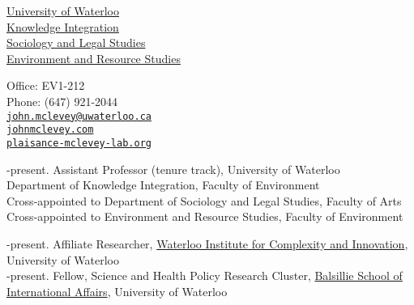 \documentclass[11pt,usenames,dvipsnames]{article}
\makeatletter
\def\myemail{john.mclevey@uwaterloo.ca}
\def\myphone{(647) 921-2044}
\def\lastupdated{Last Updated: June 25, 2013}
\makeatother
\begin{document}
\begin{minipage}[t]{2.95in}
 \flushright \footnotesize \href{https://uwaterloo.ca/}{University of Waterloo} \\  \href{https://uwaterloo.ca/knowledge-integration/faculty-mclevey}{Knowledge Integration} \\ \href{http://sociology.uwaterloo.ca/}{Sociology and Legal Studies} \\ \href{https://uwaterloo.ca/environment-resource-studies/}{Environment and Resource Studies} \\
  \end{minipage}
\hfill     
\hfill
\begin{minipage}[t]{1.7in}
  \flushright \footnotesize Office: EV1-212 \\ Phone: \myphone \\ 
  {\scriptsize  \texttt{\href{mailto:\myemail}{\myemail}}} \\
  {\scriptsize  \texttt{\href{http://www.johnmclevey.com}{johnmclevey.com}}}\\
  {\scriptsize  \texttt{\href{http://plaisance-mclevey-lab.github.io/}{plaisance-mclevey-lab.org}}}\\
\end{minipage}


\bigskip

\reversemarginpar

\bigskip 
{}
\medskip 
{}-present. Assistant Professor (tenure track), University of Waterloo \\
\noindent Department of Knowledge Integration, Faculty of Environment \\
\noindent Cross-appointed to Department of Sociology and Legal Studies, Faculty of Arts \\
\noindent Cross-appointed to Environment and Resource Studies, Faculty of Environment \\
\smallskip


-present. Affiliate Researcher, \href{http://wici.ca/new/}{Waterloo Institute for Complexity and Innovation}, University of Waterloo \\

-present. Fellow, Science and Health Policy Research Cluster, \href{http://www.balsillieschool.ca/}{Balsillie School of International Affairs}, University of Waterloo \\
\end{document}
